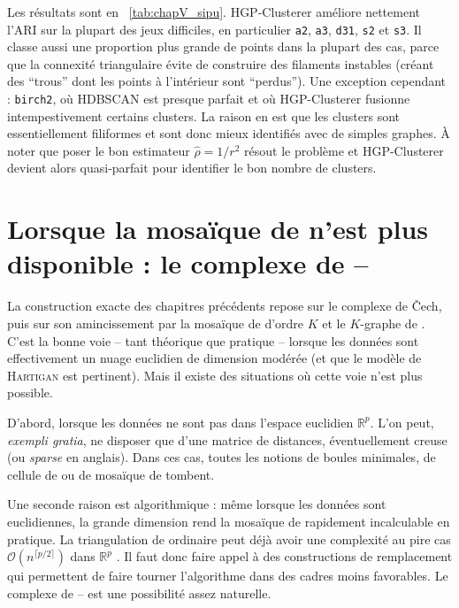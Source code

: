 Les résultats sont en \Tab~\ref{tab:chapV_sipu}. HGP-Clusterer améliore nettement l'ARI sur la plupart des jeux difficiles, en particulier \texttt{a2}, \texttt{a3}, \texttt{d31}, \texttt{s2} et \texttt{s3}. Il classe aussi une proportion plus grande de points dans la plupart des cas, parce que la connexité triangulaire évite de construire des filaments instables (créant des ``trous'' dont les points à l'intérieur sont ``perdus''). Une exception cependant : \texttt{birch2}, où HDBSCAN est presque parfait et où HGP-Clusterer fusionne intempestivement certains clusters. La raison en est que les clusters sont essentiellement filiformes et sont donc mieux identifiés avec de simples graphes. À noter que poser le bon estimateur $\widehat\rho=1/r^2$ résout le problème et HGP-Clusterer devient alors quasi-parfait pour identifier le bon nombre de clusters. %



\section{Lorsque la mosaïque de  n'est plus disponible : le complexe de --}
\label{sec:chapV_vietoris_rips}

La construction exacte des chapitres précédents repose sur le complexe de \v Cech, puis sur son amincissement par la mosaïque de  d'ordre $K$ et le $K$-graphe de . C'est la bonne voie -- tant théorique que pratique -- lorsque les données sont effectivement un nuage euclidien de dimension modérée (et que le modèle de \textsc{Hartigan} est pertinent). Mais il existe des situations où cette voie n'est plus possible.

D'abord, lorsque les données ne sont pas dans l'espace euclidien $\mathbb R^p$. L'on peut, \emph{exempli gratia}, ne disposer que d'une matrice de distances, éventuellement creuse (ou \emph{sparse} en anglais). 
Dans ces cas, toutes les notions de boules minimales, de cellule de  ou de mosaïque de  tombent.

Une seconde raison est algorithmique : même lorsque les données sont euclidiennes, la grande dimension rend la mosaïque de  rapidement incalculable en pratique. La triangulation de  ordinaire peut déjà avoir une complexité au pire cas $\mathcal O(n^{\lceil p/2\rceil})$ dans $\mathbb R^p$ \cite{BoissonnatChazalYvinec}. %
Il faut donc faire appel à des constructions de remplacement qui permettent de faire tourner l'algorithme dans des cadres moins favorables. Le complexe de -- est une possibilité assez naturelle.

